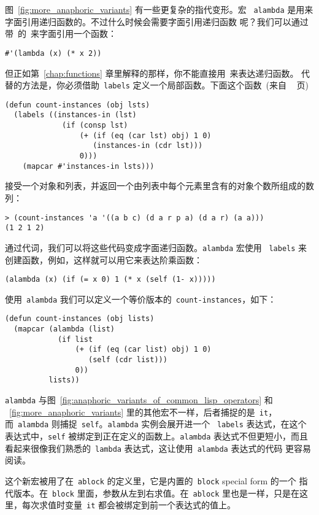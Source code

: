 图~\ref{fig:more_anaphoric_variants} 有一些更复杂的指代变形。宏
~\texttt{alambda} 是用来字面引用递归函数的。不过什么时候会需要字面引用递归函数
呢？我们可以通过带~\sq 的~\lexpr 来字面引用一个函数：
\begin{lstlisting}
#'(lambda (x) (* x 2))
\end{lstlisting}
但正如第~\ref{chap:functions} 章里解释的那样，你不能直接用~\lexpr 来表达递归函数。
代替的方法是，你必须借助~\texttt{labels} 定义一个局部函数。下面这个函数~(来自
~\pageref{fun:count-instances} 页)
\begin{lstlisting}
(defun count-instances (obj lsts)
  (labels ((instances-in (lst)
             (if (consp lst)
                 (+ (if (eq (car lst) obj) 1 0)
                    (instances-in (cdr lst)))
                 0)))
    (mapcar #'instances-in lsts)))
\end{lstlisting}
接受一个对象和列表，并返回一个由列表中每个元素里含有的对象个数所组成的数列：
\begin{lstlisting}
> (count-instances 'a '((a b c) (d a r p a) (d a r) (a a)))
(1 2 1 2)
\end{lstlisting}
通过代词，我们可以将这些代码变成字面递归函数。\verb|alambda| 宏使用
~\verb|labels| 来创建函数，例如，这样就可以用它来表达阶乘函数：
\begin{lstlisting}
(alambda (x) (if (= x 0) 1 (* x (self (1- x)))))
\end{lstlisting}
使用~\verb|alambda| 我们可以定义一个等价版本的~\verb|count-instances|，如下：
\begin{lstlisting}
(defun count-instances (obj lists)
  (mapcar (alambda (list)
            (if list
                (+ (if (eq (car list) obj) 1 0)
                   (self (cdr list)))
                0))
          lists))
\end{lstlisting}

\verb|alambda| 与图~\ref{fig:anaphoric_variants_of_common_lisp_operators} 和
~\ref{fig:more_anaphoric_variants} 里的其他宏不一样，后者捕捉的是~\verb|it|，
而~\verb|alambda| 则捕捉~\verb|self|。\verb|alambda| 实例会展开进一个
~\verb|labels| 表达式，在这个表达式中，\verb|self| 被绑定到正在定义的函数上。\verb|alambda|
表达式不但更短小，而且看起来很像我们熟悉的~\verb|lambda| 表达式，这让使用~\verb|alambda| 表达式的代码
更容易阅读。

这个新宏被用了在~\verb|ablock| 的定义里，它是内置的~\verb|block| special form 的一个
指代版本。在~\verb|block| 里面，参数从左到右求值。在~\verb|ablock|
里也是一样，只是在这里，每次求值时变量~\verb|it| 都会被绑定到前一个表达式的值上。

